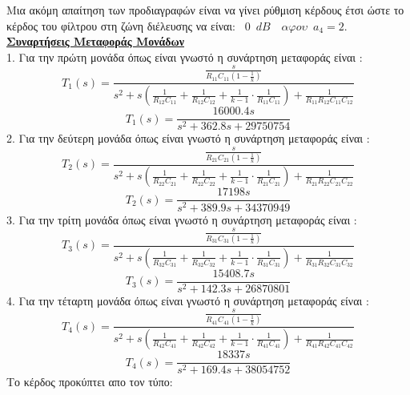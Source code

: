 \documentclass{article}
\begin{document}
{\large{}
Μια ακόμη απαίτηση των προδιαγραφών είναι να γίνει ρύθμιση κέρδους έτσι ώστε το κέρδος του φίλτρου
στη ζώνη διέλευσης να είναι: $\boxed{\enspace 0 \enspace dB \enspace} \enspace αφου \enspace a_4 =2$.  
 \\[0.4\baselineskip]
\large{ \underline{\textbf{Συναρτήσεις Μεταφοράς Μονάδων}} \\[0.4\baselineskip]
\large{}
1. Για την πρώτη μονάδα όπως είναι γνωστό η συνάρτηση μεταφοράς είναι :
\begin{equation*}
T_1(s) = \frac{\frac{s}{R_{11}C_{11}(1-\frac{1}{k})}}{s^2 + s (\frac{1}{R_{12}C_{11}}+\frac{1}{R_{12}C_{12}}+\frac{1}{k-1} \cdot \frac{1}{R_{11}C_{11}}) + \frac{1}{R_{11}R_{12}C_{11}C_{12}}}
\end{equation*}
\begin{equation*}
\boxed{
T_1(s) = \frac{16000.4s}{s^2 +362.8s+29750754}}
\end{equation*}
2. Για την δεύτερη μονάδα όπως είναι γνωστό η συνάρτηση μεταφοράς είναι :
\begin{equation*}
T_2(s) = \frac{\frac{s}{R_{21}C_{21}(1-\frac{1}{k})}}{s^2 + s (\frac{1}{R_{22}C_{21}}+\frac{1}{R_{22}C_{22}}+\frac{1}{k-1} \cdot \frac{1}{R_{21}C_{21}}) + \frac{1}{R_{21}R_{22}C_{21}C_{22}}}
\end{equation*}
\begin{equation*}
\boxed{
T_2(s) = \frac{17198s}{s^2 +389.9s+34370949}}
\end{equation*}
3. Για την τρίτη μονάδα όπως είναι γνωστό η συνάρτηση μεταφοράς είναι :
\begin{equation*}
T_3(s) = \frac{\frac{s}{R_{31}C_{31}(1-\frac{1}{k})}}{s^2 + s (\frac{1}{R_{32}C_{31}}+\frac{1}{R_{32}C_{32}}+\frac{1}{k-1} \cdot \frac{1}{R_{31}C_{31}}) + \frac{1}{R_{31}R_{32}C_{31}C_{32}}}
\end{equation*}
\begin{equation*}
\boxed{
T_3(s) = \frac{15408.7s}{s^2 +142.3s+26870801}}
\end{equation*}
4. Για την τέταρτη μονάδα όπως είναι γνωστό η συνάρτηση μεταφοράς είναι :
\begin{equation*}
T_4(s) = \frac{\frac{s}{R_{41}C_{41}(1-\frac{1}{k})}}{s^2 + s (\frac{1}{R_{42}C_{41}}+\frac{1}{R_{42}C_{42}}+\frac{1}{k-1} \cdot \frac{1}{R_{41}C_{41}}) + \frac{1}{R_{41}R_{42}C_{41}C_{42}}}
\end{equation*}
\begin{equation*}
\boxed{
T_4(s) = \frac{18337s}{s^2 +169.4s+38054752}}
\end{equation*}
Το κέρδος προκύπτει απο τον τύπο:
}}
\end{document}

